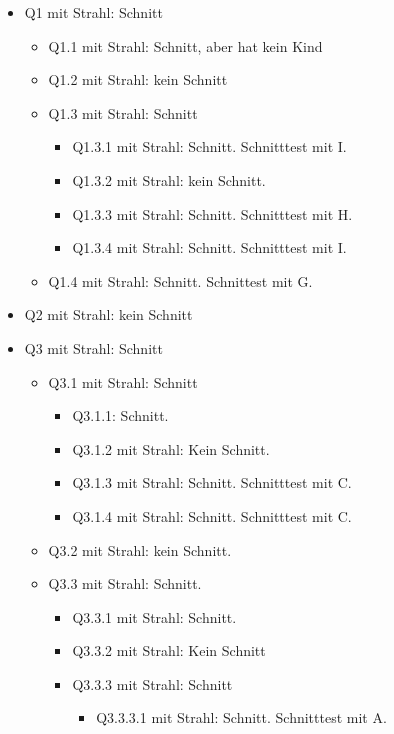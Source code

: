 \documentclass[a4paper]{scrartcl}
\begin{document}
\begin{itemize}
    \item Q1 mit Strahl: Schnitt
    \begin{itemize}
        \item Q1.1 mit Strahl: Schnitt, aber hat kein Kind
        \item Q1.2 mit Strahl: kein Schnitt
        \item Q1.3 mit Strahl: Schnitt
        \begin{itemize}
            \item Q1.3.1 mit Strahl: Schnitt. Schnitttest mit I.
            \item Q1.3.2 mit Strahl: kein Schnitt.
            \item Q1.3.3 mit Strahl: Schnitt. Schnitttest mit H.
            \item Q1.3.4 mit Strahl: Schnitt. Schnitttest mit I.
        \end{itemize}
        \item Q1.4 mit Strahl: Schnitt. Schnittest mit G.
    \end{itemize}
    \item Q2 mit Strahl: kein Schnitt
    \item Q3 mit Strahl: Schnitt
    \begin{itemize}
        \item Q3.1 mit Strahl: Schnitt
        \begin{itemize}
            \item Q3.1.1: Schnitt.
            \item Q3.1.2 mit Strahl: Kein Schnitt.
            \item Q3.1.3 mit Strahl: Schnitt. Schnitttest mit C.
            \item Q3.1.4 mit Strahl: Schnitt. Schnitttest mit C.
        \end{itemize}
        \item Q3.2 mit Strahl: kein Schnitt.
        \item Q3.3 mit Strahl: Schnitt.
        \begin{itemize}
            \item Q3.3.1 mit Strahl: Schnitt.
            \item Q3.3.2 mit Strahl: Kein Schnitt
            \item Q3.3.3 mit Strahl: Schnitt
            \begin{itemize}
                \item Q3.3.3.1 mit Strahl: Schnitt. Schnitttest mit A.

\end{itemize}
\end{itemize}
\end{itemize}
\end{itemize}
\end{document}
